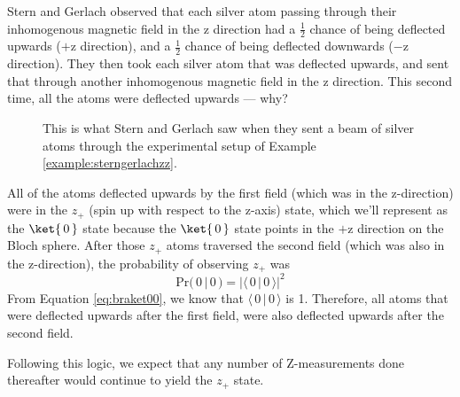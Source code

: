 \documentclass{article}
\theoremstyle{definition}
\newcommand{\abs}[1]{{\big\vert} #1 {\big\vert}}
\newcommand{\kz}[1]{\ket{\,#1\,}}
\begin{document}
\newpage
\begin{example} \label{example:sterngerlachzz}
Stern and Gerlach observed that each silver atom passing through their inhomogenous magnetic field in the z direction had a $\frac{1}{2}$ chance of being deflected upwards ($+$z direction), and a $\frac{1}{2}$ chance of being deflected downwards ($-$z direction).  They then took each silver atom that was deflected upwards, and sent that through another inhomogenous magnetic field in the z direction.  This second time, all the atoms were deflected upwards --- why?

\begin{figure}[H]
	\caption{This is what Stern and Gerlach saw when they sent a beam of silver atoms through the experimental setup of Example \ref{example:sterngerlachzz}.}
\end{figure}

\textnormal{All of the atoms deflected upwards by the first field (which was in the z-direction) were in the $z_+$ (spin up with respect to the z-axis) state, which we'll represent as the $\kz0$ state because the $\kz0$ state points in the $+$z direction on the Bloch sphere.  After those $z_+$ atoms traversed the second field (which was also in the z-direction), the probability of observing $z_+$ was
\begin{equation}
	\label{eq:prob00}
	\text{Pr}(\,0\,|\,0\,) = \abs{\langle\,0\,|\,0\,\rangle}^2
\end{equation}
From Equation \ref{eq:braket00}, we know that $\langle\,0\,|\,0\,\rangle$ is 1.  Therefore, all atoms that were deflected upwards after the first field, were also deflected upwards after the second field.}

\textnormal{Following this logic, we expect that any number of Z-measurements done thereafter would continue to yield the $z_+$ state.}
\end{example}
\end{document}
